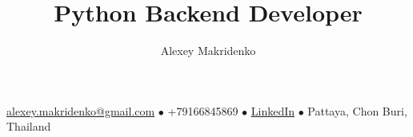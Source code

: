 \documentclass[a4paper,11pt]{article}
\makeatletter
\renewcommand{\maketitle}{
    {\Large\bfseries\theauthor}
    \vspace{.35em}

    {\bfseries\thetitle}

    \vspace{.25em}

    \underline{alexey.makridenko@gmail.com} {\scriptsize$\bullet$}
    +79166845869 {\scriptsize$\bullet$}
    \href{https://www.linkedin.com/in/makridenko/}{\underline{LinkedIn}} {\scriptsize$\bullet$}
    Pattaya, Chon Buri, Thailand
}
\makeatother
\begin{document}
\author{Alexey Makridenko}
\title{Python Backend Developer}
\maketitle






\end{document}
